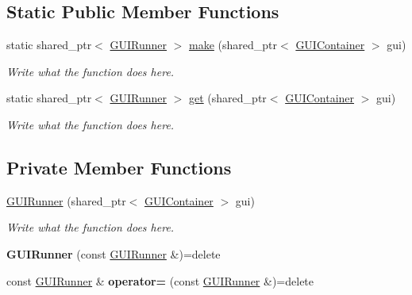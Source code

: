 \subsection*{Static Public Member Functions}
\begin{DoxyCompactItemize}
\item 
static shared\+\_\+ptr$<$ \hyperlink{classGUIRunner}{G\+U\+I\+Runner} $>$ \hyperlink{classGUIRunner_a75d10817e13347f279c658ef35e18686}{make} (shared\+\_\+ptr$<$ \hyperlink{classGUIContainer}{G\+U\+I\+Container} $>$ gui)
\begin{DoxyCompactList}\small\item\em Write what the function does here. \end{DoxyCompactList}\item 
static shared\+\_\+ptr$<$ \hyperlink{classGUIRunner}{G\+U\+I\+Runner} $>$ \hyperlink{classGUIRunner_a5e79f6335a17c69fa02eac997cc610bf}{get} (shared\+\_\+ptr$<$ \hyperlink{classGUIContainer}{G\+U\+I\+Container} $>$ gui)
\begin{DoxyCompactList}\small\item\em Write what the function does here. \end{DoxyCompactList}\end{DoxyCompactItemize}
\subsection*{Private Member Functions}
\begin{DoxyCompactItemize}
\item 
\hyperlink{classGUIRunner_addadbd965220a1a8d699dc6dcd3e211b}{G\+U\+I\+Runner} (shared\+\_\+ptr$<$ \hyperlink{classGUIContainer}{G\+U\+I\+Container} $>$ gui)
\begin{DoxyCompactList}\small\item\em Write what the function does here. \end{DoxyCompactList}\item 
\hypertarget{classGUIRunner_aca0cc460589930f95ff6eee66e1028a2}{{\bfseries G\+U\+I\+Runner} (const \hyperlink{classGUIRunner}{G\+U\+I\+Runner} \&)=delete}\label{classGUIRunner_aca0cc460589930f95ff6eee66e1028a2}

\item 
\hypertarget{classGUIRunner_afd663758b5632f28b6544479a055de2c}{const \hyperlink{classGUIRunner}{G\+U\+I\+Runner} \& {\bfseries operator=} (const \hyperlink{classGUIRunner}{G\+U\+I\+Runner} \&)=delete}\label{classGUIRunner_afd663758b5632f28b6544479a055de2c}

\end{DoxyCompactItemize}
